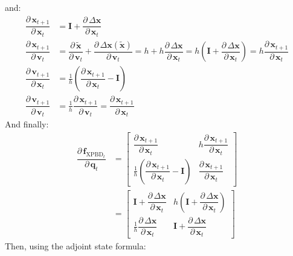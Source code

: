 \documentclass{article}
\newcommand{\pd}[2]{\dfrac{\partial\, #1}{\partial\, #2}}
\begin{document}
and:
\begin{equation*}
\begin{aligned}
\pd{\mathbf{x}_{t+1}}{\mathbf{x}_t} &= 
    \mathbf{I} + \pd{\Delta \mathbf{x}}{\mathbf{x}_t} \\[1ex]
\pd{\mathbf{x}_{t+1}}{\mathbf{v}_t} &= 
    \pd{\tilde{\mathbf{x}}}{\mathbf{v}_t} +
    \pd{\Delta \mathbf{x}(\tilde{\mathbf{x}})}{\mathbf{v}_t} = 
    h + h \pd{\Delta \mathbf{x}}{\mathbf{x}_t} = 
    h\left(\mathbf{I} + \pd{\Delta \mathbf{x}}{\mathbf{x}_t}\right) =
    h \pd{\mathbf{x}_{t+1}}{\mathbf{x}_t} \\[1ex]
\pd{\mathbf{v}_{t+1}}{\mathbf{x}_t} &= 
    \frac{1}{h}\left(\pd{\mathbf{x}_{t+1}}{\mathbf{x}_t} - \mathbf{I}\right) \\[1ex]
\pd{\mathbf{v}_{t+1}}{\mathbf{v}_t} &= 
    \frac{1}{h} \pd{\mathbf{x}_{t+1}}{\mathbf{v}_t} = 
    \pd{\mathbf{x}_{t+1}}{\mathbf{x}_t}
\end{aligned}
\end{equation*}
And finally:
\begin{equation}
\begin{aligned}
\pd{\mathbf{f}_{\text{XPBD}_t}}{\mathbf{q}_t} &= 
\begin{bmatrix}
    \displaystyle \pd{\mathbf{x}_{t+1}}{\mathbf{x}_{t}} & 
    \displaystyle h\pd{\mathbf{x}_{t+1}}{\mathbf{x}_{t}} \\[2ex]
    \displaystyle \frac{1}{h}\left(\pd{\mathbf{x}_{t+1}}{\mathbf{x}_{t}} - \mathbf{I}\right) & 
    \displaystyle \pd{\mathbf{x}_{t+1}}{\mathbf{x}_{t}}
\end{bmatrix} \\[2ex] 
&= 
\begin{bmatrix}
    \displaystyle \mathbf{I} + \pd{\Delta \mathbf{x}}{\mathbf{x}_t} & 
    \displaystyle h\left(\mathbf{I} + \pd{\Delta \mathbf{x}}{\mathbf{x}_t}\right) \\[2ex]
    \displaystyle \frac{1}{h} \pd{\Delta \mathbf{x}}{\mathbf{x}_t} & 
    \displaystyle \mathbf{I} + \pd{\Delta \mathbf{x}}{\mathbf{x}_t}
\end{bmatrix}
\end{aligned}
\end{equation}
Then, using the adjoint state formula:
\end{document}
